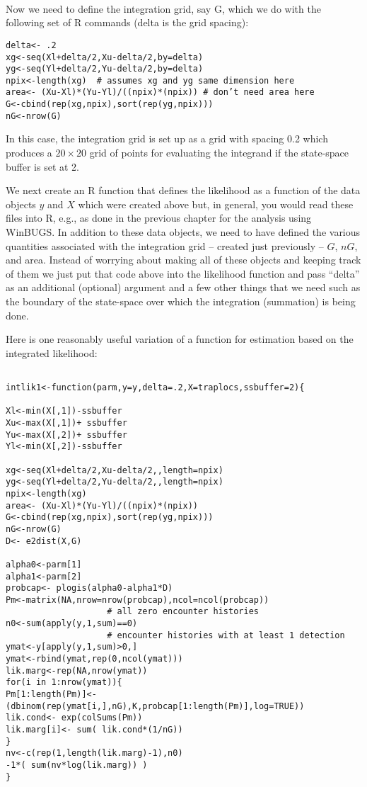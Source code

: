 \begin{verbatim}


\end{verbatim}

Now we need to define the integration grid, say G, which we do with
the following set of R commands (delta is the grid spacing):

\begin{verbatim}
delta<- .2
xg<-seq(Xl+delta/2,Xu-delta/2,by=delta) 
yg<-seq(Yl+delta/2,Yu-delta/2,by=delta) 
npix<-length(xg)  # assumes xg and yg same dimension here
area<- (Xu-Xl)*(Yu-Yl)/((npix)*(npix)) # don’t need area here
G<-cbind(rep(xg,npix),sort(rep(yg,npix)))
nG<-nrow(G)
\end{verbatim}

In this case, the integration grid is set up as a grid with spacing
0.2 which produces a $20 \times 20$ grid of points for evaluating the
integrand if the state-space buffer is set at 2.

We next create an R function that defines the likelihood as a function
of the data objects $y$ and $X$ which were created above but, in general,
you would read these files into R, e.g., as done in the previous
chapter for the analysis using WinBUGS.  In addition to these data
objects, we need to have defined the various quantities associated
with the integration grid – created just previously -- $G$, $nG$, and
area.  Instead of worrying about making all of these objects and
keeping track of them we just put that code above into the likelihood
function and pass “delta” as an additional (optional) argument and a
few other things that we need such as the boundary of the state-space
over which the integration (summation) is being done.

Here is one reasonably useful variation of a function for estimation
based on the integrated likelihood:

{\small 
\begin{verbatim}

intlik1<-function(parm,y=y,delta=.2,X=traplocs,ssbuffer=2){

Xl<-min(X[,1])-ssbuffer 
Xu<-max(X[,1])+ ssbuffer
Yu<-max(X[,2])+ ssbuffer
Yl<-min(X[,2])-ssbuffer

xg<-seq(Xl+delta/2,Xu-delta/2,,length=npix) 
yg<-seq(Yl+delta/2,Yu-delta/2,,length=npix) 
npix<-length(xg)
area<- (Xu-Xl)*(Yu-Yl)/((npix)*(npix))
G<-cbind(rep(xg,npix),sort(rep(yg,npix)))
nG<-nrow(G)
D<- e2dist(X,G)  

alpha0<-parm[1]
alpha1<-parm[2]
probcap<- plogis(alpha0-alpha1*D)
Pm<-matrix(NA,nrow=nrow(probcap),ncol=ncol(probcap))
                    # all zero encounter histories
n0<-sum(apply(y,1,sum)==0) 
                    # encounter histories with at least 1 detection
ymat<-y[apply(y,1,sum)>0,] 
ymat<-rbind(ymat,rep(0,ncol(ymat)))
lik.marg<-rep(NA,nrow(ymat))
for(i in 1:nrow(ymat)){
Pm[1:length(Pm)]<- (dbinom(rep(ymat[i,],nG),K,probcap[1:length(Pm)],log=TRUE))
lik.cond<- exp(colSums(Pm))
lik.marg[i]<- sum( lik.cond*(1/nG))  
}
nv<-c(rep(1,length(lik.marg)-1),n0)
-1*( sum(nv*log(lik.marg)) )
}
\end{verbatim}
}


